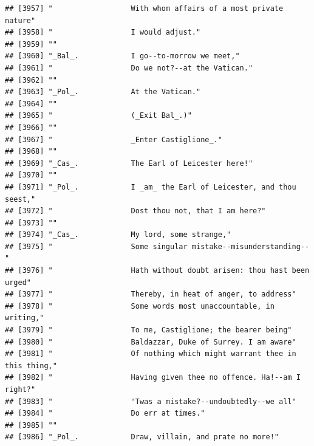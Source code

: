 \documentclass{article}\usepackage[]{graphicx}\usepackage[]{color}
\makeatletter
\newenvironment{kframe}{%
 \def\at@end@of@kframe{}%
 \ifinner\ifhmode%
  \def\at@end@of@kframe{\end{minipage}}%
  \begin{minipage}{\columnwidth}%
 \fi\fi%
 \def\FrameCommand##1{\hskip\@totalleftmargin \hskip-\fboxsep
 \colorbox{shadecolor}{##1}\hskip-\fboxsep
     \hskip-\linewidth \hskip-\@totalleftmargin \hskip\columnwidth}%
 \MakeFramed {\advance\hsize-\width
   \@totalleftmargin\z@ \linewidth\hsize
   \@setminipage}}%
 {\par\unskip\endMakeFramed%
 \at@end@of@kframe}
\newenvironment{knitrout}{}{} %
\makeatother
\begin{document}
\begin{knitrout}
\begin{kframe}
\begin{verbatim}
## [3957] "                  With whom affairs of a most private nature"                
## [3958] "                  I would adjust."                                           
## [3959] ""                                                                            
## [3960] "_Bal_.            I go--to-morrow we meet,"                                  
## [3961] "                  Do we not?--at the Vatican."                               
## [3962] ""                                                                            
## [3963] "_Pol_.            At the Vatican."                                           
## [3964] ""                                                                            
## [3965] "                  (_Exit Bal_.)"                                             
## [3966] ""                                                                            
## [3967] "                  _Enter Castiglione_."                                      
## [3968] ""                                                                            
## [3969] "_Cas_.            The Earl of Leicester here!"                               
## [3970] ""                                                                            
## [3971] "_Pol_.            I _am_ the Earl of Leicester, and thou seest,"             
## [3972] "                  Dost thou not, that I am here?"                            
## [3973] ""                                                                            
## [3974] "_Cas_.            My lord, some strange,"                                    
## [3975] "                  Some singular mistake--misunderstanding--"                 
## [3976] "                  Hath without doubt arisen: thou hast been urged"           
## [3977] "                  Thereby, in heat of anger, to address"                     
## [3978] "                  Some words most unaccountable, in writing,"                
## [3979] "                  To me, Castiglione; the bearer being"                      
## [3980] "                  Baldazzar, Duke of Surrey. I am aware"                     
## [3981] "                  Of nothing which might warrant thee in this thing,"        
## [3982] "                  Having given thee no offence. Ha!--am I right?"            
## [3983] "                  'Twas a mistake?--undoubtedly--we all"                     
## [3984] "                  Do err at times."                                          
## [3985] ""                                                                            
## [3986] "_Pol_.            Draw, villain, and prate no more!"                         

\end{verbatim}
\end{kframe}
\end{knitrout}
\end{document}
